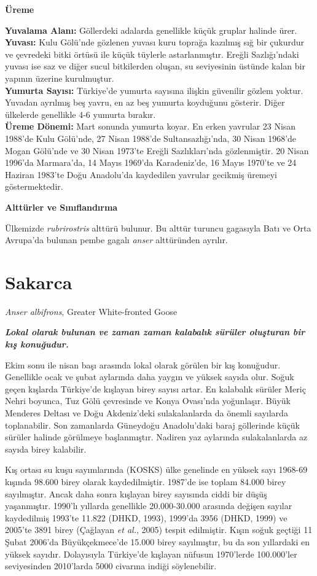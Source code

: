 \documentclass[
  a4paper,
  DIV=11,
  numbers=noendperiod]{scrreprt}
\begin{document}
\textbf{Üreme}

\textbf{Yuvalama Alanı:} Göllerdeki adalarda genellikle küçük gruplar
halinde ürer.\\
\textbf{Yuvası:} Kulu Gölü'nde gözlenen yuvası kuru toprağa kazılmış sığ
bir çukurdur ve çevredeki bitki örtüsü ile küçük tüylerle
astarlanmıştır. Ereğli Sazlığı'ndaki yuvası ise saz ve diğer sucul
bitkilerden oluşan, su seviyesinin üstünde kalan bir yapının üzerine
kurulmuştur.\\
\textbf{Yumurta Sayısı:} Türkiye'de yumurta sayısına ilişkin güvenilir
gözlem yoktur. Yuvadan ayrılmış beş yavru, en az beş yumurta koyduğunu
gösterir. Diğer ülkelerde genellikle 4-6 yumurta bırakır.\\
\textbf{Üreme Dönemi:} Mart sonunda yumurta koyar. En erken yavrular 23
Nisan 1988'de Kulu Gölü'nde, 27 Nisan 1988'de Sultansazlığı'nda, 30
Nisan 1968'de Mogan Gölü'nde ve 30 Nisan 1973'te Ereğli Sazlıkları'nda
gözlenmiştir. 20 Nisan 1996'da Marmara'da, 14 Mayıs 1969'da
Karadeniz'de, 16 Mayıs 1970'te ve 24 Haziran 1983'te Doğu Anadolu'da
kaydedilen yavrular gecikmiş üremeyi göstermektedir.

\textbf{Alttürler ve Sınıflandırma}

Ülkemizde \emph{rubrirostris} alttürü bulunur. Bu alttür turuncu
gagasıyla Batı ve Orta Avrupa'da bulunan pembe gagalı \emph{anser}
alttüründen ayrılır.

\section{Sakarca}\label{sakarca}

\emph{Anser albifrons}, Greater White-fronted Goose

\textbf{\emph{Lokal olarak bulunan ve zaman zaman kalabalık sürüler
oluşturan bir kış konuğudur.}}

Ekim sonu ile nisan başı arasında lokal olarak görülen bir kış
konuğudur. Genellikle ocak ve şubat aylarında daha yaygın ve yüksek
sayıda olur. Soğuk geçen kışlarda Türkiye'de kışlayan birey sayısı
artar. En kalabalık sürüler Meriç Nehri boyunca, Tuz Gölü çevresinde ve
Konya Ovası'nda yoğunlaşır. Büyük Menderes Deltası ve Doğu Akdeniz'deki
sulakalanlarda da önemli sayılarda toplanabilir. Son zamanlarda
Güneydoğu Anadolu'daki baraj göllerinde küçük sürüler halinde görülmeye
başlanmıştır. Nadiren yaz aylarında sulakalanlarda az sayıda birey
kalabilir.

Kış ortası su kuşu sayımlarında (KOSKS) ülke genelinde en yüksek sayı
1968-69 kışında 98.600 birey olarak kaydedilmiştir. 1987'de ise toplam
84.000 birey sayılmıştır. Ancak daha sonra kışlayan birey sayısında
ciddi bir düşüş yaşanmıştır. 1990'lı yıllarda genellikle 20.000-30.000
arasında değişen sayılar kaydedilmiş 1993'te 11.822 (DHKD, 1993),
1999'da 3956 (DHKD, 1999) ve 2005'te 3891 birey (Çağlayan \emph{et al.},
2005) tespit edilmiştir. Kışın soğuk geçtiği 11 Şubat 2006'da
Büyükçekmece'de 15.000 birey sayılmıştır, bu da son yıllardaki en yüksek
sayıdır. Dolayısıyla Türkiye'de kışlayan nüfusun 1970'lerde 100.000'ler
seviyesinden 2010'larda 5000 civarına indiği söylenebilir.
\end{document}
